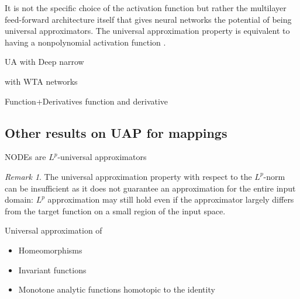 \documentclass{article}
\theoremstyle{definition}
\theoremstyle{remark}
\newtheorem{remark}{Remark}
\newcounter{ct}
\begin{document}


It is not the specific choice of the activation function but rather the multilayer feed-forward architecture itself that gives neural networks the potential of being universal approximators\citep{hornik1991approximation}.
%
The universal approximation property is equivalent to having a nonpolynomial activation function \citep{pinkus1999approximation}.

\citep{mhaskar1997neural}

UA with Deep narrow \citep{kidger2020universal}

with WTA networks \citep{maass2000wta}

Function+Derivatives \citep{hornik1990universal}
function and derivative \citep{li1996simultaneous}


\subsection{Other results on UAP for mappings}
NODEs are $L^p$-universal approximators \citep{li2022deep,li2022deeparxiv}
\begin{remark}
The universal approximation property with respect to the $L^p$-norm can be insufficient as it does not guarantee an approximation for the entire input domain:
 $L^p$ approximation may still hold even if the approximator largely differs from the target function on a small region of the input space.
\end{remark}


Universal approximation of 
\begin{itemize}
\item Homeomorphisms \citep{zhang2020approximation}
\item Invariant functions\citep{li2022deep}
\item Monotone analytic functions homotopic to the identity\citep{tabuada2020universal}
\end{itemize}
\end{document}
